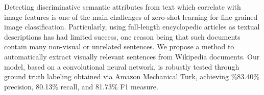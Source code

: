 Detecting discriminative semantic attributes from text which correlate with image features is one of the main challenges of zero-shot learning for fine-grained image classification. Particularly, using full-length encyclopedic articles as textual descriptions has had limited success, one reason being that such documents contain many non-visual or unrelated sentences. We propose a method to automatically extract visually relevant sentences from Wikipedia documents. Our model, based on a convolutional neural network, is robustly tested through ground truth labeling obtained via Amazon Mechanical Turk, achieving \%83.40\% precision, 80.13\% recall, and 81.73\% F1 measure.
